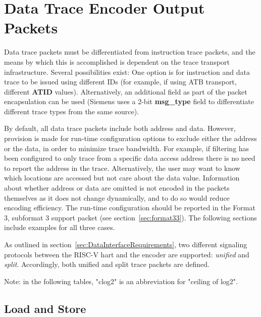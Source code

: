 \chapter{Data Trace Encoder Output Packets} \label{dataTracePackets}

Data trace packets must be differentiated from instruction trace packets, and the means by which
this is accomplished is dependent on the trace transport infrastructure.  Several possibilities exist:
One option is for instruction and data trace to be issued using different IDs (for example, if using ATB transport,
different \textbf{ATID} values).  Alternatively, an additional field as part of the packet encapsulation can be 
used (Siemens uses a 2-bit \textbf{msg\_type} field to differentiate different trace types from the same source).

By default, all data trace packets include both address and data.  However, provision is made for run-time 
configuration options to exclude either the address or the data, in order to minimize trace bandwidth.  For example,
if filtering has been configured to only trace from a specific data access address there is no need to report
the address in the trace.  Alternatively, the user may want to know which locations are accessed but not care 
about the data value. Information about whether address or data are omitted is not encoded in the packets
themselves as it does not change dynamically, and to do so would reduce encoding efficiency.  The run-time
configuration should be reported in the Format 3, subformat 3 support packet (see section~\ref{sec:format33}).
The following sections include examples for all three cases.

As outlined in section~\ref{sec:DataInterfaceRequirements}, two different signaling protocols
between the RISC-V hart and the encoder are supported: \textit{unified} and \textit{split}.
Accordingly, both unified and split trace packets are defined.

Note: in the following tables, "clog2" is an abbreviation for "ceiling of log2".

\section{Load and Store} \label{sec:data-loadstore}

